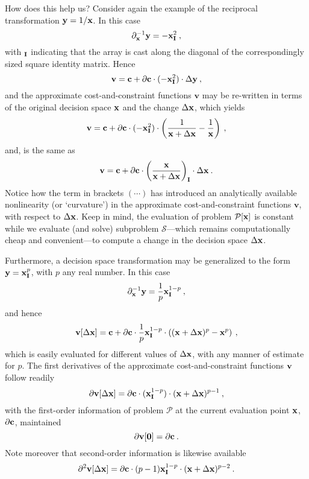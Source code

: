 \documentclass[11pt]{article}
\begin{document}
How does this help us? Consider again the example of the reciprocal transformation $\mathbf{y} = 1/ \mathbf{x}$. In this case
\begin{equation}
\partial_{\mathbf{x}}^{-1} \mathbf{y} = - \mathbf{x}_{\mathbf{I}}^2   \: ,
\end{equation}
with $_{\mathbf{I}}$ indicating that the array is cast along the diagonal of the correspondingly sized square identity matrix. Hence
\begin{equation}
    \textbf{v} = \mathbf{c} + \partial \mathbf{c}  \cdot (-\mathbf{x}_{\mathbf{I}}^2) \cdot \Delta \mathbf{y}  \:,
\end{equation}
and the approximate cost-and-constraint functions $\textbf{v}$ may be re-written in terms of the original decision space $\mathbf{x}$ and the change $\Delta \mathbf{x}$, which yields
\begin{equation}
    \textbf{v} = \mathbf{c} + \partial \mathbf{c} \cdot (-\mathbf{x}_{\mathbf{I}}^2)  \cdot \left( \frac{1}{ \mathbf{x} + \Delta\mathbf{x}} - \frac{1}{\mathbf{x}} \right)   \:,
\end{equation}
and, is the same as
\begin{equation}
    \textbf{v} = \mathbf{c} + \partial \mathbf{c}  \cdot \left( \frac{\mathbf{x}}{\mathbf{x} + \Delta \mathbf{x}} \right)_{\mathbf{I}}\cdot \Delta \mathbf{x}   \:.
\end{equation}
Notice how the term in brackets $(\cdots)$ has introduced an analytically available nonlinearity (or `curvature') in the approximate cost-and-constraint functions $\textbf{v}$, with respect to $\Delta \mathbf{x}$. Keep in mind, the evaluation of problem $\mathcal{P} [\mathbf{x}]$ is constant while we evaluate (and solve) subproblem $\mathcal{S}$---which remains computationally cheap and convenient---to compute a change in the decision space $\Delta \mathbf{x}$.

Furthermore, a decision space transformation may be generalized to the form $\mathbf{y} = \mathbf{x}_{\mathbf{I}}^p$, with $p$ any real number. In this case
\begin{equation}
\partial_{\mathbf{x}}^{-1} \mathbf{y} = \frac {1}{p} \mathbf{x}_{\mathbf{I}}^{1-p}   \: ,
\end{equation}
and hence
\begin{equation}
    \mathbf{v}[\Delta \mathbf{x}] = \mathbf{c} + \partial \mathbf{c} \cdot \frac {1}{p}  \mathbf{x}_{\mathbf{I}}^{1-p}  \cdot \left( (\mathbf{x} + \Delta\mathbf{x})^p - \mathbf{x}^p \right)   \:,
\end{equation}
which is easily evaluated for different values of $\Delta \mathbf{x}$, with any manner of estimate for $p$. The first derivatives of the approximate cost-and-constraint functions $\mathbf{v}$ follow readily
\begin{equation}
\partial\mathbf{v}[\Delta \mathbf{x}] = \partial \mathbf{c} \cdot (\mathbf{x}_{\mathbf{I}}^{1-p}) \cdot (\mathbf{x} + \Delta \mathbf{x})^{p-1} \:,
\end{equation}
with the first-order information of problem $\mathcal{P}$ at the current evaluation point $\mathbf{x}$, $\partial \mathbf{c}$, maintained
\begin{equation}
\partial\mathbf{v}[ \mathbf{0}] = \partial \mathbf{c} \:.
\end{equation}
Note moreover that second-order information is likewise available
\begin{equation}
\label{eq:d2p}
\partial^2 \mathbf{v}[\Delta \mathbf{x}] = \partial \mathbf{c} \cdot (p-1)\mathbf{x}_{\mathbf{I}}^{1-p} \cdot (\mathbf{x}+\Delta\mathbf{x})^{p-2} \: .
\end{equation}
\end{document}
